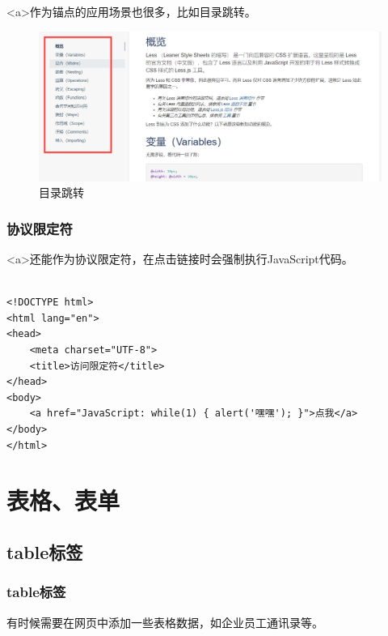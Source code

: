 <a>作为锚点的应用场景也很多，比如目录跳转。

\begin{figure}[H]
	\centering
	\includegraphics[scale=0.35]{img/C3/3-4/1.png}
	\caption{目录跳转}
\end{figure}

\vspace{0.5cm}

\subsection{协议限定符}

<a>还能作为协议限定符，在点击链接时会强制执行JavaScript代码。\\

\\

\begin{lstlisting}[style=htmlcssjs]
<!DOCTYPE html>
<html lang="en">
<head>
    <meta charset="UTF-8">
    <title>访问限定符</title>
</head>
<body>
    <a href="JavaScript: while(1) { alert('嘿嘿'); }">点我</a>
</body>
</html>
\end{lstlisting}

\newpage

\chapter{表格、表单}

\section{table标签}

\subsection{table标签}

有时候需要在网页中添加一些表格数据，如企业员工通讯录等。

